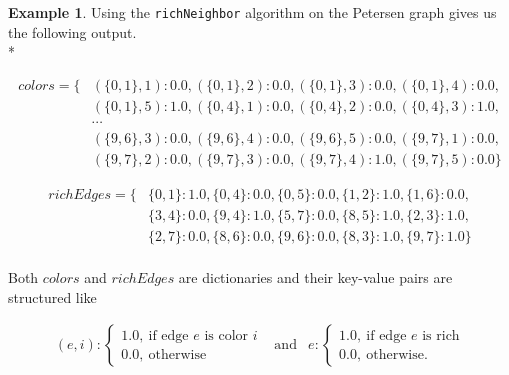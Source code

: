 \documentclass[12pt,a4paper]{amsart}
\theoremstyle{definition} %
\newtheorem{primer}[definicija]{Example}
\theoremstyle{plain} %
\begin{document}
            \begin{primer}
                Using the \texttt{richNeighbor} algorithm on the Petersen graph gives us the following output.\\*

                \begin{align*}
                    colors = \{ & (\{0, 1\}, 1): 0.0, (\{0, 1\}, 2): 0.0, (\{0, 1\}, 3): 0.0, (\{0, 1\}, 4): 0.0,\\
                                & (\{0, 1\}, 5): 1.0, (\{0, 4\}, 1): 0.0, (\{0, 4\}, 2): 0.0, (\{0, 4\}, 3): 1.0,\\
                                & \cdots \\
                                & (\{9, 6\}, 3): 0.0, (\{9, 6\}, 4): 0.0, (\{9, 6\}, 5): 0.0, (\{9, 7\}, 1): 0.0,\\
                                & (\{9, 7\}, 2): 0.0, (\{9, 7\}, 3): 0.0, (\{9, 7\}, 4): 1.0, (\{9, 7\}, 5): 0.0\}
                \end{align*}

                \begin{align*}
                    richEdges = \{& \{0, 1\}: 1.0, \{0, 4\}: 0.0, \{0, 5\}: 0.0, \{1, 2\}: 1.0, \{1, 6\}: 0.0,\\
                                  & \{3, 4\}: 0.0, \{9, 4\}: 1.0, \{5, 7\}: 0.0, \{8, 5\}: 1.0, \{2, 3\}: 1.0,\\
                                  & \{2, 7\}: 0.0, \{8, 6\}: 0.0, \{9, 6\}: 0.0, \{8, 3\}: 1.0, \{9, 7\}: 1.0\}\\
                \end{align*}

                \noindent Both $colors$ and $richEdges$ are dictionaries and their key-value pairs are structured like

                \begin{align*}
                    (e, i):
                    \begin{cases}
                        1.0, \  \text{if edge $e$ is color $i$} \\
                        0.0, \  \text{otherwise}
                    \end{cases} & \text{and} & 
                    e:
                    \begin{cases}
                        1.0, \  \text{if edge $e$ is rich} \\
                        0.0, \  \text{otherwise.}
                    \end{cases}
                \end{align*}

            \end{primer}    
\end{document}
